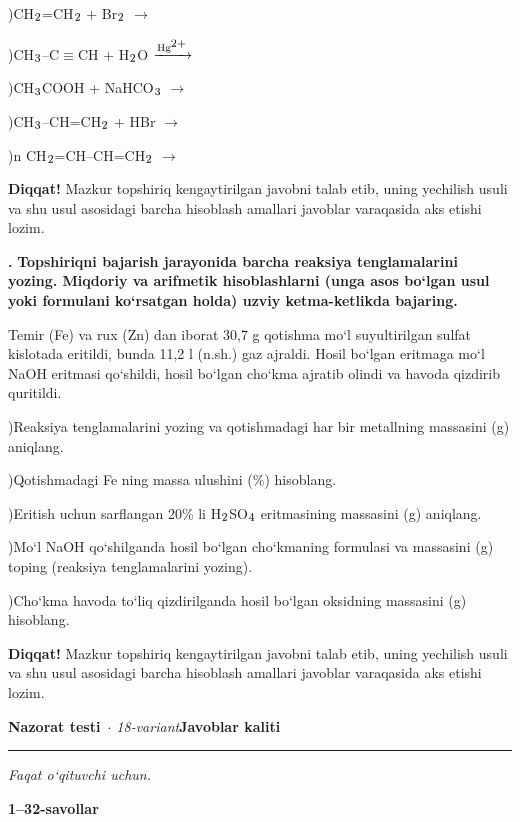 \documentclass[11pt,a4paper]{article}
\renewcommand{\textsubscript}[1]{\ensuremath{_{\text{\fontsize{8}{8}\selectfont #1}}}}
\renewcommand{\textsuperscript}[1]{\ensuremath{^{\text{\fontsize{8}{8}\selectfont #1}}}}
\newcommand{\qn}[1]{\textbf{\fontsize{11.5}{13}\selectfont #1}}
\newcommand{\qsep}{\par\vspace{1pt}\noindent\rule{0pt}{0.4pt}\par\vspace{5pt}}
\newcommand{\diqqat}[1]{\par\smallskip\noindent\textbf{Diqqat!} #1\par\medskip}
\begin{document}
)CH\textsubscript{2}=CH\textsubscript{2} + Br\textsubscript{2} $\to$\par
{})CH\textsubscript{3}--C$\equiv$CH + H\textsubscript{2}O $\xrightarrow{\text{Hg\textsuperscript{2+}}}$\par
{})CH\textsubscript{3}COOH + NaHCO\textsubscript{3} $\to$\par
{})CH\textsubscript{3}--CH=CH\textsubscript{2} + HBr $\to$\par
{})n CH\textsubscript{2}=CH--CH=CH\textsubscript{2} $\to$\par
\diqqat{Mazkur topshiriq kengaytirilgan javobni talab etib, uning yechilish usuli va shu usul asosidagi barcha hisoblash amallari javoblar varaqasida aks etishi lozim.}\qsep
\noindent\qn{43.} \textbf{Topshiriqni bajarish jarayonida barcha reaksiya tenglamalarini yozing. Miqdoriy va arifmetik hisoblashlarni (unga asos bo`lgan usul yoki formulani ko`rsatgan holda) uzviy ketma-ketlikda bajaring.}\par\smallskip
Temir (Fe) va rux (Zn) dan iborat 30,7 g qotishma mo`l suyultirilgan sulfat kislotada eritildi, bunda 11,2 l (n.sh.) gaz ajraldi. Hosil bo`lgan eritmaga mo`l NaOH eritmasi qo`shildi, hosil bo`lgan cho`kma ajratib olindi va havoda qizdirib quritildi.\par
{})Reaksiya tenglamalarini yozing va qotishmadagi har bir metallning massasini (g) aniqlang.\par
{})Qotishmadagi Fe ning massa ulushini (\%) hisoblang.\par
{})Eritish uchun sarflangan 20\% li H\textsubscript{2}SO\textsubscript{4} eritmasining massasini (g) aniqlang.\par
{})Mo`l NaOH qo`shilganda hosil bo`lgan cho`kmaning formulasi va massasini (g) toping (reaksiya tenglamalarini yozing).\par
{})Cho`kma havoda to`liq qizdirilganda hosil bo`lgan oksidning massasini (g) hisoblang.\par
\diqqat{Mazkur topshiriq kengaytirilgan javobni talab etib, uning yechilish usuli va shu usul asosidagi barcha hisoblash amallari javoblar varaqasida aks etishi lozim.}\qsep
\newpage
\noindent\textbf{\fontsize{13}{15}\selectfont Nazorat testi}\ \textit{$\cdot$ 18-variant}\hfill \textbf{Javoblar kaliti}\par\smallskip\hrule\smallskip
\textit{Faqat o`qituvchi uchun.}\par\medskip
\noindent\textbf{1--32-savollar}\par\smallskip
\end{document}
